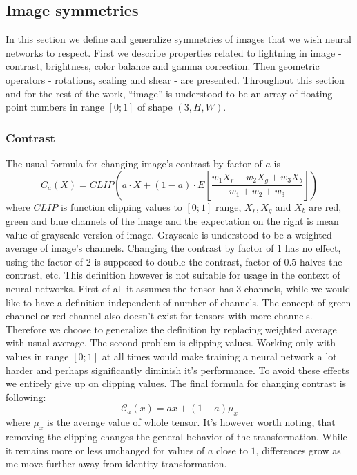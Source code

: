 \subsection{Image symmetries}
    \label{sec:transformations}
    In this section we define and generalize symmetries of images that we wish
    neural networks to respect. First we describe
    properties related to lightning in image - contrast,
    brightness, color balance and gamma correction. Then geometric operators -
    rotations, scaling and shear - are presented.
    Throughout this section and for the rest of the work,
    ``image'' is understood to be an array of
    floating point numbers in range $\left[0;1\right]$ of shape $\left(3, H,
    W\right)$.
    \subsubsection{Contrast}
    \newcommand\mcc{\mathcal{C}}
        The usual formula for changing image's contrast by factor of $a$ is
        \begin{equation}
            \label{eq:contrast_old}
        C_a(X) = \mathit{CLIP}\left(a\cdot X + (1-a) \cdot E\left[ \frac{w_1X_r
        + w_2X_g + w_3X_b}{w_1+w_2+w_3}\right]   \right)
        \end{equation}
        where
        $\mathit{CLIP}$ is function clipping values to $\left[0;1\right]$ range,
        $X_r, X_g$ and $X_b$ are red, green and blue channels of the image and
        the expectation on the right is mean value of grayscale version of
        image.  Grayscale is understood to be a weighted average of image's
        channels.  Changing the contrast by factor of $1$ has no effect, using
        the factor of $2$ is supposed to double the contrast, factor of $0.5$
        halves the contrast, etc.  This definition however is not suitable for
        usage in the context of neural networks.  First of all it assumes the
        tensor has 3 channels, while we would like to have a definition
        independent of number of channels. The concept of green channel or red
        channel also doesn't exist for tensors with more channels. Therefore we
        choose to generalize the definition by replacing weighted average with
        usual average. The second problem is clipping values. Working only with
        values in range $\left[0;1\right]$ at all times would make training a
        neural network a lot harder and perhaps significantly diminish it's
        performance. To avoid these effects we entirely give up on clipping
        values.  The final formula for changing contrast is following:
        \begin{equation}
            \label{eq:contrast}
            \mathcal{C}_a(x) = ax + (1-a) \mu_x
        \end{equation}
        where $\mu_x$ is the average value of whole tensor. It's however worth
        noting, that removing the clipping changes the general behavior of the
        transformation.  While it remains more or less unchanged for values of
        $a$ close to $1$, differences grow as me move further away from identity
        transformation.


